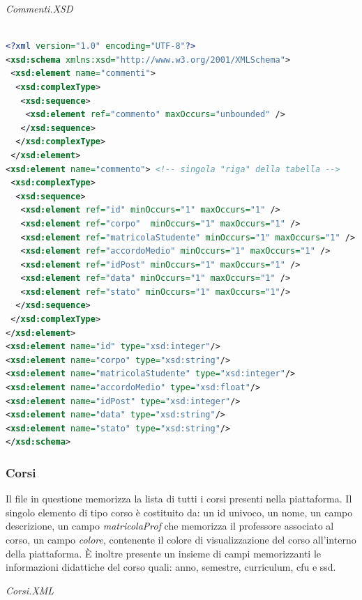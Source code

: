 \documentclass [a4paper,11pt]{book}
\begin{document}
\medskip

\emph{Commenti.XSD}

\begin{lstlisting}[language=XML]

<?xml version="1.0" encoding="UTF-8"?>
<xsd:schema xmlns:xsd="http://www.w3.org/2001/XMLSchema">
 <xsd:element name="commenti">
  <xsd:complexType>
   <xsd:sequence>
    <xsd:element ref="commento" maxOccurs="unbounded" />
   </xsd:sequence>
  </xsd:complexType>
 </xsd:element>
<xsd:element name="commento"> <!-- singola "riga" della tabella -->
 <xsd:complexType>
  <xsd:sequence>
   <xsd:element ref="id" minOccurs="1" maxOccurs="1" />
   <xsd:element ref="corpo"  minOccurs="1" maxOccurs="1" />
   <xsd:element ref="matricolaStudente" minOccurs="1" maxOccurs="1" />
   <xsd:element ref="accordoMedio" minOccurs="1" maxOccurs="1" />
   <xsd:element ref="idPost" minOccurs="1" maxOccurs="1" />
   <xsd:element ref="data" minOccurs="1" maxOccurs="1" />
   <xsd:element ref="stato" minOccurs="1" maxOccurs="1"/>
  </xsd:sequence>   
 </xsd:complexType>
</xsd:element>
<xsd:element name="id" type="xsd:integer"/>
<xsd:element name="corpo" type="xsd:string"/>
<xsd:element name="matricolaStudente" type="xsd:integer"/>
<xsd:element name="accordoMedio" type="xsd:float"/>
<xsd:element name="idPost" type="xsd:integer"/>
<xsd:element name="data" type="xsd:string"/>
<xsd:element name="stato" type="xsd:string"/>
</xsd:schema>
\end{lstlisting}

\medskip

\subsubsection{Corsi}	%

Il file in questione memorizza la lista di tutti i corsi presenti nella piattaforma. Il singolo elemento di tipo corso è costituito da: un id univoco, un nome, un campo descrizione, un campo \emph{matricolaProf} che memorizza il professore associato al corso, un campo \emph{colore}, contenente il colore di visualizzazione del corso all'interno della piattaforma. È inoltre presente un insieme di campi memorizzanti le informazioni didattiche del corso quali: anno, semestre, curriculum, cfu e ssd.

\medskip

\emph{Corsi.XML}

\label{sec:corsi}
\end{document}
